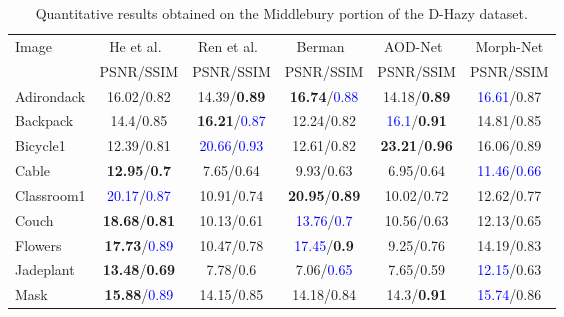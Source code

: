 \documentclass[12pt]{article}
\begin{document}
\begin{table*}[h]
  \centering
  \caption{Quantitative results obtained on the Middlebury portion of the D-Hazy dataset.}
  \label{tab:comp:middlebury}
  \begin{tabular}{l|ccccc}
    \toprule
     Image & He et al.~\cite{he_single_2011} & Ren et al.~\cite{ren_single_2016} & Berman~\cite{berman_non-local_2016} & AOD-Net~\cite{li_aod-net:_2017} &Morph-Net\\
    & PSNR/SSIM                    & PSNR/SSIM                & PSNR/SSIM                    & PSNR/SSIM            &PSNR/SSIM  \\ \midrule
Adirondack  & 16.02/0.82                   & 14.39/\textbf{0.89}               & \textbf{16.74}/\textcolor{blue}{0.88}             & 14.18/\textbf{0.89}           &\textcolor{blue}{16.61}/0.87       \\
Backpack    & 14.4/0.85                    & \textbf{16.21}/{\textcolor{blue}{0.87}} & 12.24/0.82                   & {  \textcolor{blue}{16.1}}/\textbf{0.91}      &14.81/0.85  \\
Bicycle1    & 12.39/0.81                   & {\textcolor{blue}{20.66}}/\textcolor{blue}{0.93}         & 12.61/0.82              & \textbf{23.21}/\textbf{0.96}      &16.06/{0.89}     \\
Cable       & \textbf{12.95}/\textbf{0.7}  & 7.65/0.64                & { 9.93}/0.63              & 6.95/0.64                           &\textcolor{blue}{11.46}/\textcolor{blue}{0.66} \\
Classroom1  & {\textcolor{blue}{20.17}}/{\textcolor{blue}{0.87}}       & 10.91/0.74               & \textbf{20.95}/\textbf{0.89} & 10.02/0.72                       &12.62/0.77   \\
Couch       & \textbf{18.68}/\textbf{0.81} & 10.13/0.61               & \textcolor{blue}{13.76}/\textcolor{blue}{0.7}           & 10.56/0.63                         &12.13/0.65       \\
Flowers     & \textbf{17.73}/{\textcolor{blue}{0.89}}    & 10.47/0.78               & {\textcolor{blue}{17.45}}/\textbf{0.9}     & 9.25/0.76                        &14.19/0.83  \\
Jadeplant   & \textbf{13.48}/\textbf{0.69} & 7.78/0.6                 & 7.06/\textcolor{blue}{0.65}                    & 7.65/0.59                    &\textcolor{blue}{12.15}/0.63  \\
Mask        & \textbf{15.88}/\textcolor{blue}{0.89}                   & 14.15/0.85               & {14.18}/0.84                   & 14.3/\textbf{0.91}                  &\textcolor{blue}{15.74}/0.86          \\

\end{tabular}
\end{table*}
\end{document}
